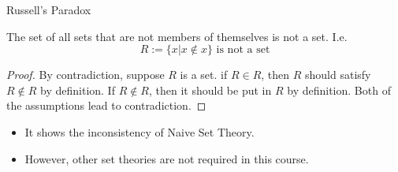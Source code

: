 \begin{frame}{Russell's Paradox}
    \begin{theorem}
        The set of all sets that are not members of themselves is not a set. I.e. $$R:=\{x|x\notin x\} \text{ is not a set}$$
    \end{theorem}
    \begin{proof}
        By contradiction, suppose $R$ is a set. if $R\in R$, then $R$ should satisfy $R\notin R$ by definition. If $R\notin R$, then it should be put in $R$ by definition.
        Both of the assumptions lead to contradiction.
    \end{proof}
    \begin{itemize}
        \item It shows the inconsistency of Naive Set Theory.
        \item However, other set theories are not required in this course.
    \end{itemize}
\end{frame}